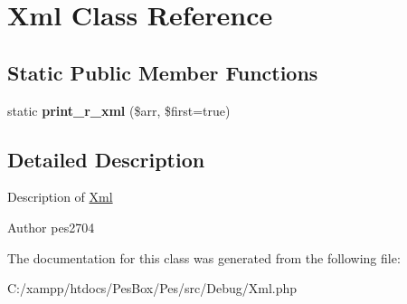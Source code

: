 \hypertarget{class_pes_1_1_debug_1_1_xml}{}\section{Xml Class Reference}
\label{class_pes_1_1_debug_1_1_xml}
\subsection*{Static Public Member Functions}
\begin{DoxyCompactItemize}
\item 
\mbox{\label{class_pes_1_1_debug_1_1_xml_a11e9570d25e72ea632a35149d283f0df}} 
static {\bfseries print\+\_\+r\+\_\+xml} (\$arr, \$first=true)
\end{DoxyCompactItemize}


\subsection{Detailed Description}
Description of \mbox{\hyperlink{class_pes_1_1_debug_1_1_xml}{Xml}}

\begin{DoxyAuthor}{Author}
pes2704 
\end{DoxyAuthor}


The documentation for this class was generated from the following file\+:\begin{DoxyCompactItemize}
\item 
C\+:/xampp/htdocs/\+Pes\+Box/\+Pes/src/\+Debug/Xml.\+php\end{DoxyCompactItemize}
